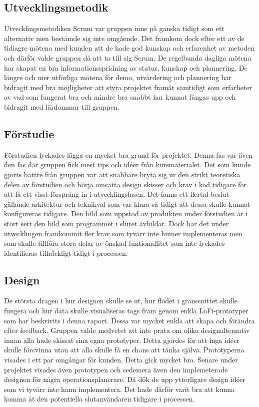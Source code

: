 \subsection{Utvecklingsmetodik}
Utvecklingsmetodiken Scrum var gruppen inne på ganska tidigt som ett alternativ men bestämde sig inte omgående. Det framkom dock efter ett av de tidiagre mötena med kunden att de hade god kunskap och erfarenhet av metoden och därför valde gruppen då att ta till sig Scrum. De regelbunda dagliga mötena har skapat en bra informationsspridning av status, kunskap och plannering. De längre och mer utförliga mötena för demo, utvärdering och plannering har bidragit med bra möjligheter att styra projektet framåt samtidigt som erfarheter av vad som fungerat bra och mindre bra snabbt har kunnat fångas upp och bidragit med lärdommar till gruppen.

\subsection{Förstudie}
Förstudien lyckades lägga en mycket bra grund för projektet. Denna fas var även den fas där gruppen fick mest tips och idéer från kursmaterialet. Det som kunde gjorts bättre från gruppen var att snabbare bryta sig ur den strikt teoretiska delen av förstudien och börja omsätta design skisser och krav i kod tidigare för att få ett visst försprång in i utvecklingsfasen. Det fanns ett flertal beslut gällande arkitektur och teknikval som var klara så tidigt att dessa skulle kunnat konfigureras tidigare. Den bild som uppstod av produkten under förstudien är i stort sett den bild som programmet i slutet avbildar. Dock har det under utvecklingen framkommit fler krav som tyvärr inte hinner implementeras men som skulle tillföra stora delar av önskad funtionallitet som inte lyckades identifieras tillräckligt tidigt i processen.

\subsection{Design}
De största dragen i hur designen skulle se ut, hur flödet i gränssnittet skulle fungera och hur data skulle visualiseras togs fram genom enkla LoFi-prototyper som har beskrivits i denna raport. Dessa var mycket enkla att skapa och förändra efter feedback. Gruppen valde medvetet att inte prata om olika designalternativ innan alla hade skissat sina egna prototyper. Detta gjordes för att inga idéer skulle försvinna utan att alla skulle få en chans att tänka själva. Prototyperna visades i ett par omgångar för kunden. Detta gick mycket bra. Senare under projektet visades även prototypen och sedemera även den implemeterade designen för några operationsplanerare. Då dök de upp ytterligare design idéer som vi tyvärr inte hann implementera. Det hade därför varit bra att kunna komma åt den potentiella slutanvändaren tidigare i processen.

